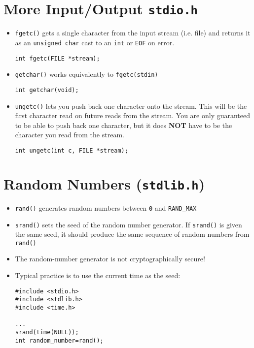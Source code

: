 \documentclass{article}
\begin{document}
\section{More Input/Output \texttt{stdio.h}}
\begin{itemize}
\item \verb!fgetc()! gets a single character from the input stream (i.e. file) and returns it as an \verb!unsigned char! cast to an \verb!int! or \verb!EOF! on error.
\begin{verbatim}
int fgetc(FILE *stream);
\end{verbatim}
\item \verb!getchar()! works equivalently to \verb!fgetc(stdin)!
\begin{verbatim}
int getchar(void);
\end{verbatim}
\item \verb!ungetc()! lets you push back one character onto the stream. This will be the first character read on future reads from the stream. You are only guaranteed to be able to push back one character, but it does \textbf{NOT} have to be the character you read from the stream.
\begin{verbatim}
int ungetc(int c, FILE *stream);
\end{verbatim}
\end{itemize}



\section{Random Numbers (\texttt{stdlib.h})}
\begin{itemize}
\item \verb!rand()! generates random numbers between \verb!0! and \verb!RAND_MAX!
\item \verb!srand()! sets the seed of the random number generator. If \verb!srand()! is given the same seed, it should produce the same sequence of random numbers from \verb!rand()!
\item The random-number generator is not cryptographically secure!
\item Typical practice is to use the current time as the seed:

\begin{verbatim}
#include <stdio.h>
#include <stdlib.h>
#include <time.h>

...
srand(time(NULL));
int random_number=rand();
\end{verbatim}
\end{itemize}
\end{document}

